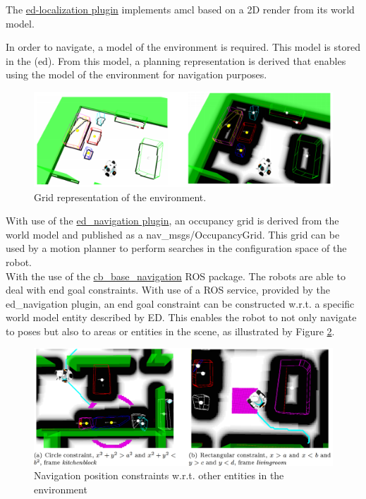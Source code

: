 The \href{{https://github.com/tue-robotics/ed_localization}}{\acrshort{ed}-localization plugin} implements \acrshort{amcl} based on a 2D render from its world model.

In order to navigate, a model of the environment is required. This model is stored in the (\acrshort{ed}). From this model, a planning representation is derived that enables using the model of the environment for navigation purposes.
\begin{figure}[hb]
	\includegraphics[width = \linewidth]{Figures/ed_navigation}
	\caption{Grid representation of the environment.}
	\label{fig:ed_navigation}
\end{figure}
With use of the \href{https://github.com/tue-robotics/ed_navigation}{ed\_navigation plugin}, an occupancy grid is derived from the world model and published as a nav\_msgs/OccupancyGrid. This grid can be used by a motion planner to perform searches in the configuration space of the robot.
\\
With the use of the \href{https://github.com/tue-robotics/cb_base_navigation}{cb\_base\_navigation} ROS package. The robots are able to deal with end goal constraints. With use of a ROS service, provided by the ed\_navigation plugin, an end goal constraint can be constructed w.r.t. a specific world model entity described by ED. This enables the robot to not only navigate to poses but also to areas or entities in the scene, as illustrated by Figure \ref{fig:ed_navigation_constraints}.
\begin{figure}[h]
    \centering
	\includegraphics[width = 0.9\linewidth]{Figures/ed_navigation_constraints}
	\caption{Navigation position constraints w.r.t. other entities in the environment}
	\label{fig:ed_navigation_constraints}
\end{figure}

